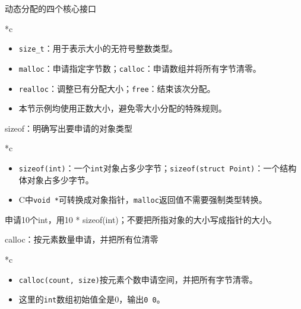 \begin{frame}{动态分配的四个核心接口}
\begin{Code}*{c}\end{Code}\begin{itemize}
\item \texttt{size\_t}：用于表示大小的无符号整数类型。
\item \texttt{malloc}：申请指定字节数；\texttt{calloc}：申请数组并将所有字节清零。
\item \texttt{realloc}：调整已有分配大小；\texttt{free}：结束该次分配。
\item 本节示例均使用\alert{正数大小}，避免零大小分配的特殊规则。
\end{itemize}
\end{frame}

\begin{frame}{sizeof：明确写出要申请的对象类型}
\begin{Code}*{c}\end{Code}
\begin{center}
\end{center}
\begin{itemize}
    \item \texttt{sizeof(int)}：一个\texttt{int}对象占多少字节；\texttt{sizeof(struct Point)}：一个结构体对象占多少字节。
    \item C中\texttt{void *}可转换成对象指针，\texttt{malloc}返回值不需要强制类型转换。
\end{itemize}
\alert{申请10个int，用10 * sizeof(int)；不要把所指对象的大小写成指针的大小。}
\end{frame}


\begin{frame}{calloc：按元素数量申请，并把所有位清零}
\begin{Code}*{c}\end{Code}\begin{itemize}
\item \texttt{calloc(count, size)}按元素个数申请空间，并把所有字节清零。
\item 这里的\texttt{int}数组初始值全是0，输出\texttt{0 0}。
\end{itemize}

\end{frame}

